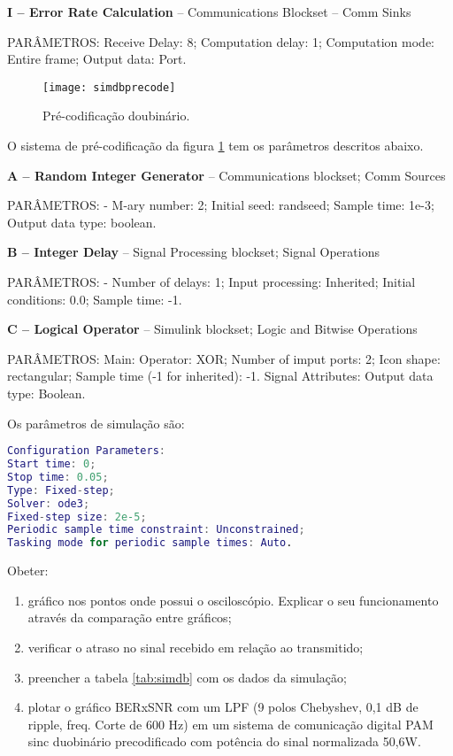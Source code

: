 \textbf{I – Error Rate Calculation} – Communications Blockset – Comm Sinks

PARÂMETROS: Receive Delay: 8; Computation delay: 1; Computation mode: Entire frame; Output data: Port.
\\
\begin{figure}[H]
  \centering
  \caption{Pré-codificação doubinário.}
  \texttt{[image: simdbprecode]}
  \label{fig:simdbprecode}
\end{figure}

O sistema de pré-codificação da figura \ref{fig:simdbprecode} tem os parâmetros descritos abaixo.

\textbf{A – Random Integer Generator	} – Communications blockset; Comm Sources

PARÂMETROS: - M-ary number: 2; Initial seed: randseed; Sample time: 1e-3; Output data type: boolean.

\textbf{B – Integer Delay} – Signal Processing blockset; Signal Operations

PARÂMETROS: - Number of delays: 1; Input processing: Inherited; Initial conditions: 0.0; Sample time: -1.

\textbf{C – Logical Operator} – Simulink blockset; Logic and Bitwise Operations

PARÂMETROS: Main: Operator: XOR; Number of imput ports: 2; Icon shape: rectangular; Sample time (-1 for inherited): -1. Signal Attributes: Output data type: Boolean.

Os parâmetros de simulação são:

\begin{lstlisting}[language=matlab]
Configuration Parameters: 
Start time: 0; 
Stop time: 0.05; 
Type: Fixed-step; 
Solver: ode3;  
Fixed-step size: 2e-5; 
Periodic sample time constraint: Unconstrained; 
Tasking mode for periodic sample times: Auto.
\end{lstlisting}

Obeter:
\begin{enumerate}
  \item gráfico nos pontos onde possui o osciloscópio. Explicar o seu funcionamento através da comparação entre gráficos;
  
  \item verificar o atraso no sinal recebido em relação ao transmitido;
  
  \item preencher a tabela \ref{tab:simdb} com os dados da simulação;
  
  \item plotar o gráfico BERxSNR com um LPF (9 polos Chebyshev, 0,1 dB de ripple, freq. Corte de 600 Hz) em um sistema de comunicação digital PAM sinc duobinário precodificado com potência do sinal normalizada 50,6W.
\end{enumerate}

